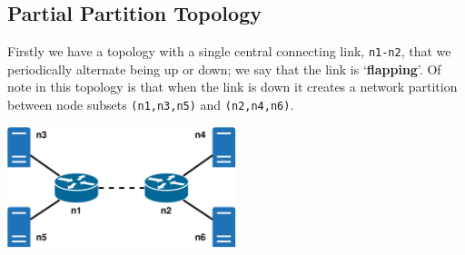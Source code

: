 \documentclass[withindex,glossary,openany]{cam-thesis}
\begin{document}
\subsection{Partial Partition Topology}
\label{subsec:partial_partition}

Firstly we have a topology with a single central connecting link, \texttt{n1-n2}, that we periodically alternate being up or down; we say that the link is `\textbf{flapping}'. Of note in this topology is that when the link is down it creates a network partition between node subsets \texttt{(n1,n3,n5)} and \texttt{(n2,n4,n6)}.

\begin{minipage}{1\textwidth} \centering
	\includegraphics[width=0.5\textwidth]{delay_partition_topology}
	\label{fig:partition_topology}
\end{minipage}
\end{document}

